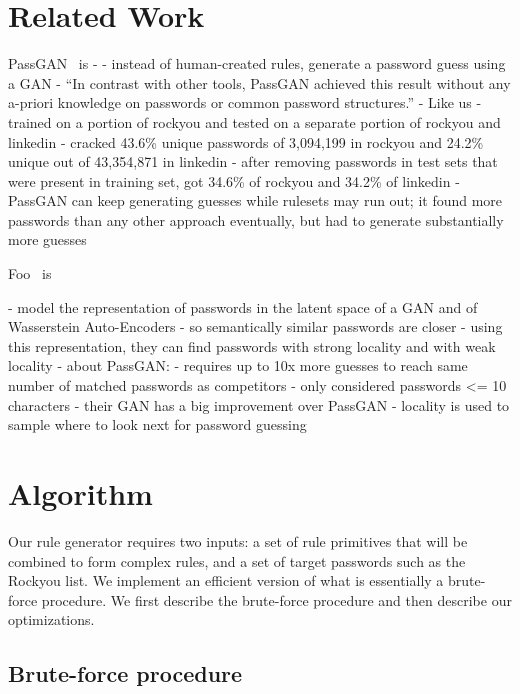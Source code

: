 \documentclass[letterpaper,twocolumn,10pt]{article}
\begin{document}
\section{Related Work}

PassGAN~\cite{hitaj2019passgan} is
- - instead of human-created rules, generate a password guess using a GAN
- “In contrast with other tools, PassGAN achieved this result without any
a-priori knowledge on passwords or common password structures.”
    - Like us
- trained on a portion of rockyou and tested on a separate portion of rockyou
and linkedin
    - cracked 43.6\% unique passwords of 3,094,199 in rockyou and 24.2\% unique
out of 43,354,871 in linkedin
    - after removing passwords in test sets that were present in training set,
got 34.6\% of rockyou and 34.2\% of linkedin
- PassGAN can keep generating guesses while rulesets may run out; it found more
passwords than any other approach eventually, but had to generate substantially
more guesses

Foo~\cite{pasquini2021improving} is

- model the representation of passwords in the latent space of a GAN and of
Wasserstein Auto-Encoders
    - so semantically similar passwords are closer
- using this representation, they can find passwords with strong locality and
with weak locality
- about PassGAN:
    - requires up to 10x more guesses to reach same number of matched passwords
as competitors
    - only considered passwords <= 10 characters
- their GAN has a big improvement over PassGAN
- locality is used to sample where to look next for password guessing

\section{Algorithm}
\label{sec:algorithm}

Our rule generator requires two inputs: a set of rule primitives that will be
combined to form complex rules, and a set of target passwords such as the
Rockyou list. We implement an efficient version of what is essentially a
brute-force procedure. We first describe the brute-force procedure and then
describe our optimizations.


\subsection{Brute-force procedure}
\end{document}
